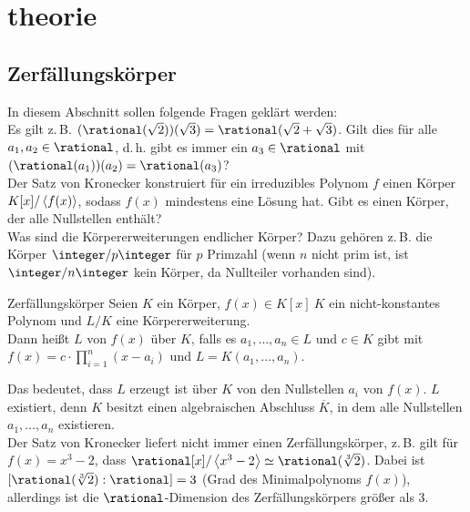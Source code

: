 \section{%
    theorie%
}

\subsection{%
    Zerfällungskörper%
}

\begin{Bem}
    In diesem Abschnitt sollen folgende Fragen geklärt werden:\\
    Es gilt z.\,B. $(\rational(\sqrt{2}))(\sqrt{3}) =
    \rational(\sqrt{2} + \sqrt{3})$.
    Gilt dies für alle $a_1, a_2 \in \rational$, d.\,h. gibt es immer
    ein $a_3 \in \rational$ mit $(\rational(a_1))(a_2) = \rational(a_3)$?\\
    Der Satz von Kronecker konstruiert für ein irreduzibles Polynom $f$
    einen Körper $K[x]/\left\langle f(x)\right\rangle$, sodass $f(x)$ mindestens eine Lösung
    hat.
    Gibt es einen Körper, der alle Nullstellen enthält?\\
    Was sind die Körpererweiterungen endlicher Körper?
    Dazu gehören z.\,B. die Körper $\integer/p\integer$ für
    $p$ Primzahl
    (wenn $n$ nicht prim ist, ist $\integer/n\integer$ kein Körper, da
    Nullteiler vorhanden sind).
\end{Bem}

\linie

\begin{Def}{Zerfällungskörper}
    Seien $K$ ein Körper,
    $f(x) \in K[x] \ K$ ein nicht-konstantes Polynom und
    $L/K$ eine Körpererweiterung.\\
    Dann heißt $L$  von $f(x)$ über $K$, falls
    es $a_1, \dotsc, a_n \in L$ und $c \in K$ gibt mit\\
    $f(x) = c \cdot \prod_{i=1}^n (x - a_i)$ und
    $L = K(a_1, \dotsc, a_n)$.
\end{Def}

\begin{Bem}
    Das bedeutet, dass $L$ erzeugt ist über $K$ von den Nullstellen $a_i$ von
    $f(x)$.
    $L$ existiert, denn $K$ besitzt einen algebraischen Abschluss
    $\overline{K}$, in dem alle Nullstellen $a_1, \dotsc, a_n$ existieren.\\
    Der Satz von Kronecker liefert nicht immer einen Zerfällungskörper,
    z.\,B. gilt für $f(x) = x^3 - 2$, dass
    $\rational[x]/\erzeugnis{x^3 - 2} \simeq \rational(\sqrt[3]{2})$.
    Dabei ist $[\rational(\sqrt[3]{2}) : \rational] = 3$
    (Grad des Minimalpolynoms $f(x)$), allerdings
    ist die $\rational$-Dimension des Zerfällungskörpers größer als $3$.
\end{Bem}

